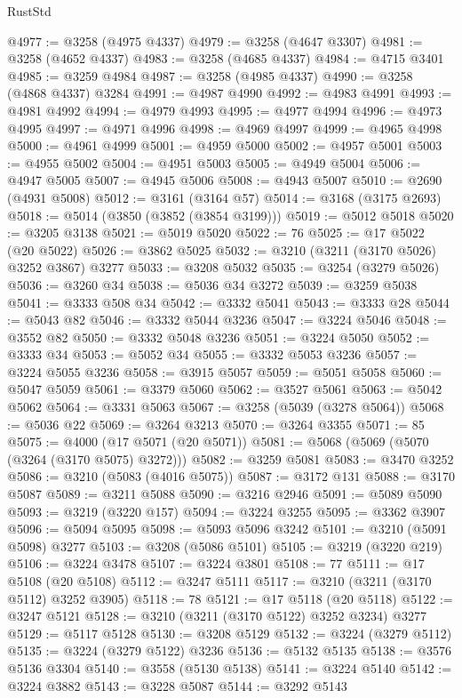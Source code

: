 \begin{lexlean}{RustStd}
\begin{coremodule}
@4977 := @3258 (@4975 @4337)
@4979 := @3258 (@4647 @3307)
@4981 := @3258 (@4652 @4337)
@4983 := @3258 (@4685 @4337)
@4984 := @4715 @3401
@4985 := @3259 @4984
@4987 := @3258 (@4985 @4337)
@4990 := @3258 (@4868 @4337) @3284
@4991 := @4987 @4990
@4992 := @4983 @4991
@4993 := @4981 @4992
@4994 := @4979 @4993
@4995 := @4977 @4994
@4996 := @4973 @4995
@4997 := @4971 @4996
@4998 := @4969 @4997
@4999 := @4965 @4998
@5000 := @4961 @4999
@5001 := @4959 @5000
@5002 := @4957 @5001
@5003 := @4955 @5002
@5004 := @4951 @5003
@5005 := @4949 @5004
@5006 := @4947 @5005
@5007 := @4945 @5006
@5008 := @4943 @5007
@5010 := @2690 (@4931 @5008)
@5012 := @3161 (@3164 @57)
@5014 := @3168 (@3175 @2693)
@5018 := @5014 (@3850 (@3852 (@3854 @3199)))
@5019 := @5012 @5018
@5020 := @3205 @3138
@5021 := @5019 @5020
@5022 := 76
@5025 := @17 @5022 (@20 @5022)
@5026 := @3862 @5025
@5032 := @3210 (@3211 (@3170 @5026) @3252 @3867) @3277
@5033 := @3208 @5032
@5035 := @3254 (@3279 @5026)
@5036 := @3260 @34
@5038 := @5036 @34 @3272
@5039 := @3259 @5038
@5041 := @3333 @508 @34
@5042 := @3332 @5041
@5043 := @3333 @28
@5044 := @5043 @82
@5046 := @3332 @5044 @3236
@5047 := @3224 @5046
@5048 := @3552 @82
@5050 := @3332 @5048 @3236
@5051 := @3224 @5050
@5052 := @3333 @34
@5053 := @5052 @34
@5055 := @3332 @5053 @3236
@5057 := @3224 @5055 @3236
@5058 := @3915 @5057
@5059 := @5051 @5058
@5060 := @5047 @5059
@5061 := @3379 @5060
@5062 := @3527 @5061
@5063 := @5042 @5062
@5064 := @3331 @5063
@5067 := @3258 (@5039 (@3278 @5064))
@5068 := @5036 @22
@5069 := @3264 @3213
@5070 := @3264 @3355
@5071 := 85
@5075 := @4000 (@17 @5071 (@20 @5071))
@5081 := @5068 (@5069 (@5070 (@3264 (@3170 @5075) @3272)))
@5082 := @3259 @5081
@5083 := @3470 @3252
@5086 := @3210 (@5083 (@4016 @5075))
@5087 := @3172 @131
@5088 := @3170 @5087
@5089 := @3211 @5088
@5090 := @3216 @2946
@5091 := @5089 @5090
@5093 := @3219 (@3220 @157)
@5094 := @3224 @3255
@5095 := @3362 @3907
@5096 := @5094 @5095
@5098 := @5093 @5096 @3242
@5101 := @3210 (@5091 @5098) @3277
@5103 := @3208 (@5086 @5101)
@5105 := @3219 (@3220 @219)
@5106 := @3224 @3478
@5107 := @3224 @3801
@5108 := 77
@5111 := @17 @5108 (@20 @5108)
@5112 := @3247 @5111
@5117 := @3210 (@3211 (@3170 @5112) @3252 @3905)
@5118 := 78
@5121 := @17 @5118 (@20 @5118)
@5122 := @3247 @5121
@5128 := @3210 (@3211 (@3170 @5122) @3252 @3234) @3277
@5129 := @5117 @5128
@5130 := @3208 @5129
@5132 := @3224 (@3279 @5112)
@5135 := @3224 (@3279 @5122) @3236
@5136 := @5132 @5135
@5138 := @3576 @5136 @3304
@5140 := @3558 (@5130 @5138)
@5141 := @3224 @5140
@5142 := @3224 @3882
@5143 := @3228 @5087
@5144 := @3292 @5143

\end{coremodule}
\end{lexlean}
